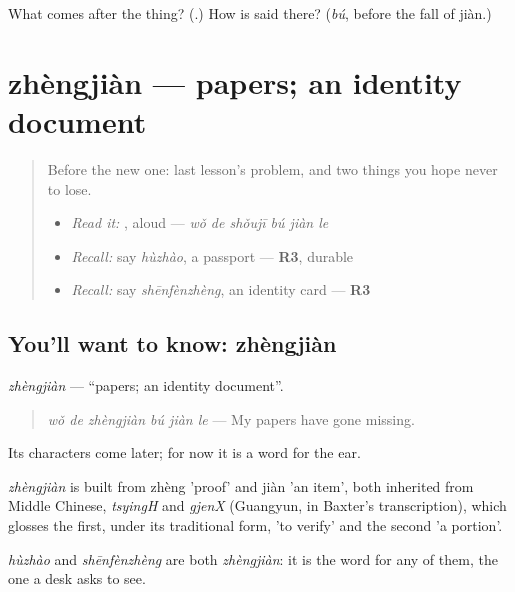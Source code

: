 \begin{tcolorbox}[breakable,colback=teal!4,colframe=teal!35!black,title={Before you move on}]
What comes after the thing? (\textbf{}.) How is  said there? (\emph{bú}, before the fall of jiàn.)
\end{tcolorbox}
\section[zhèngjiàn]{zhèngjiàn — papers; an identity document}

\label{lesson:ZH-C285-zhengjian}



\begin{quote}
Before the new one: last lesson's problem, and two things you hope never to lose.

\begin{itemize}
\raggedright
  \item \emph{Read it:} , aloud — \emph{wǒ de shǒujī bú jiàn le}
  \item \emph{Recall:} say \emph{hùzhào}, a passport — \textbf{R3}, durable
  \item \emph{Recall:} say \emph{shēnfènzhèng}, an identity card — \textbf{R3}
\end{itemize}
\end{quote}

\subsection*{You'll want to know: zhèngjiàn}
\emph{zhèngjiàn} — \textquotedblleft{}papers; an identity document\textquotedblright{}.

\begin{quote}
\emph{wǒ de zhèngjiàn bú jiàn le} — My papers have gone missing.
\end{quote}

Its characters come later; for now it is a word for the ear.

\begin{cousinweb}
\emph{zhèngjiàn} is built from zhèng 'proof' and jiàn 'an item', both inherited from Middle Chinese, \emph{tsyingH} and \emph{gjenX} (Guangyun, in Baxter's transcription), which glosses the first, under its traditional form, 'to verify' and the second 'a portion'.
\end{cousinweb}

\begin{grammarlens}[title={What you've built}]
\emph{hùzhào} and \emph{shēnfènzhèng} are both \emph{zhèngjiàn}: it is the word for any of them, the one a desk asks to see.
\end{grammarlens}

